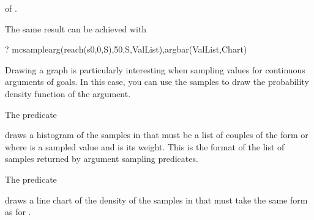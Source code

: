 \documentclass[letterpaper,10pt,english]{sphinxmanual}
\begin{document}
of .

The same result can be achieved with

\begin{sphinxVerbatim}[commandchars=\\\{\}]
?\PYGZhy{} mc\PYGZus{}sample\PYGZus{}arg(reach(s0,0,S),50,S,ValList),argbar(ValList,Chart)
\end{sphinxVerbatim}

Drawing a graph is particularly interesting when sampling values for continuous arguments of goals.
In this case, you can use the samples to draw the probability density function of the argument.

The predicate

\begin{sphinxVerbatim}[commandchars=\\\{\}]
  
\end{sphinxVerbatim}

draws a histogram of the samples in  that must be a list of couples of the form  or  where  is a sampled value and  is its weight.
This is the format of the list of samples returned by argument sampling predicates.

The predicate

\begin{sphinxVerbatim}[commandchars=\\\{\}]
  
\end{sphinxVerbatim}

draws a line chart of the density of the samples in  that must take the same form as for .
\end{document}
